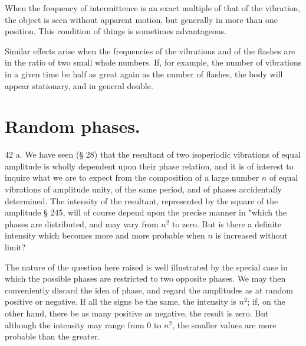 When the frequency of intermittence is an exact multiple of that of the
vibration, the object is seen without apparent motion, but generally in more
than one position. This condition of things is sometimes advantageous.

Similar effects arise when the frequencies of the vibrations and of the flashes
are in the ratio of two small whole numbers. If, for example, the number of
vibrations in a given time be half as great again as the number of flashes, the
body will appear stationary, and in general double.

\section{Random phases.}
42 a.  We have seen (§ 28) that the resultant of two isoperiodic vibrations of equal
amplitude is wholly dependent upon their phase relation, and it is of interest
to inquire what we are to expect from the composition of a large number \(n\)
of equal vibrations of amplitude unity, of the same period, and of phases
accidentally determined. The intensity of the resultant, represented by the
square of the amplitude § 245,  will of
course depend upon the precise manner in "which the phases are distributed, and
may vary from \(n^2\) to zero. But is there a definite intensity which becomes
more and more probable when \(n\) is increased without limit?

The nature of the question here raised is well illustrated by the special case
in which the possible phases are restricted to two opposite phases. We may then
conveniently discard the idea of phase, and regard the amplitudes as at random
positive or negative. If all the signs be the same, the intensity is \(n^2\);
if, on the other hand, there be as many positive as negative, the result is
zero. But although the intensity may range from 0 to \(n^2\), the smaller
values are more probable than the greater.


